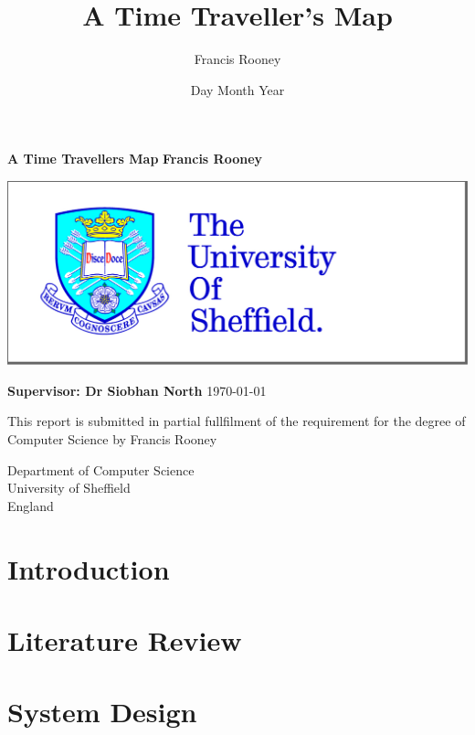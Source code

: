 \documentclass[12pt,twoside]{report}
\title{A Time Traveller's Map}
\author{Francis Rooney}
\begin{document}
 



\begin{titlepage}
    \begin{center}
        \vspace{1cm}
        
        \textbf{A Time Travellers Map}
        \break
        \break
        \vspace{1.5cm}
        \textbf{Francis Rooney}
        
         \vspace{1.5cm}
        
        \includegraphics{tuoslogo.jpg}
        
        \vspace{1.5cm}
        
        \textbf{Supervisor: Dr Siobhan North}
        \break
        \break
        \today
        \vfill
        
        This report is submitted in partial fullfilment of the requirement for the degree of\\
        Computer Science by Francis Rooney
        
        \vspace{0.8cm}
        
              
        Department of Computer Science\\
        University of Sheffield\\
        England\\
        \date{Day Month Year}
        
    \end{center}
\end{titlepage}

\tableofcontents

\chapter{Introduction}



\chapter{Literature Review}


\chapter{System Design}

\end{document}
